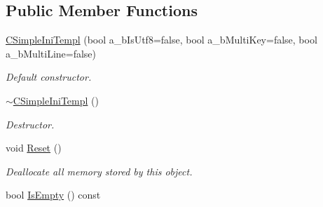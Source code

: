 \subsection*{Public Member Functions}
\begin{DoxyCompactItemize}
\item 
\hyperlink{class_c_simple_ini_templ_af878d0a2aa780255b621e95f58f691d8}{C\+Simple\+Ini\+Templ} (bool a\+\_\+b\+Is\+Utf8=false, bool a\+\_\+b\+Multi\+Key=false, bool a\+\_\+b\+Multi\+Line=false)
\begin{DoxyCompactList}\small\item\em Default constructor. \end{DoxyCompactList}\item 
\hyperlink{class_c_simple_ini_templ_a8c933adc1d46bb663caeb6f9dee5aa12}{$\sim$\+C\+Simple\+Ini\+Templ} ()\hypertarget{class_c_simple_ini_templ_a8c933adc1d46bb663caeb6f9dee5aa12}{}\label{class_c_simple_ini_templ_a8c933adc1d46bb663caeb6f9dee5aa12}

\begin{DoxyCompactList}\small\item\em Destructor. \end{DoxyCompactList}\item 
void \hyperlink{class_c_simple_ini_templ_a89b34d38be4518e9ed91c634a41b8055}{Reset} ()\hypertarget{class_c_simple_ini_templ_a89b34d38be4518e9ed91c634a41b8055}{}\label{class_c_simple_ini_templ_a89b34d38be4518e9ed91c634a41b8055}

\begin{DoxyCompactList}\small\item\em Deallocate all memory stored by this object. \end{DoxyCompactList}\item 
bool \hyperlink{class_c_simple_ini_templ_acaada2b1ab734fc7dd8780ba7f376c26}{Is\+Empty} () const \hypertarget{class_c_simple_ini_templ_acaada2b1ab734fc7dd8780ba7f376c26}{}\label{class_c_simple_ini_templ_acaada2b1ab734fc7dd8780ba7f376c26}


\end{DoxyCompactItemize}
